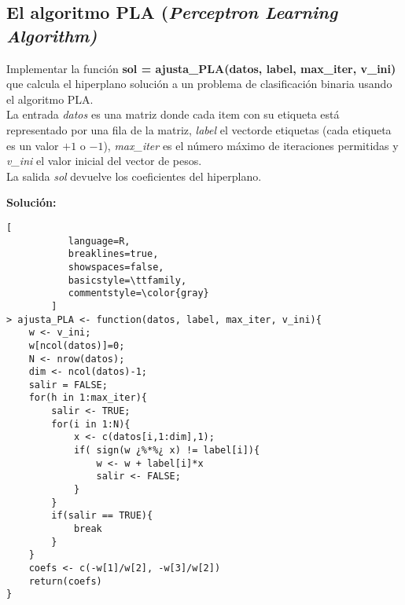 \documentclass[11pt,fleqn]{book} %
\begin{document}
\subsection{El algoritmo PLA (\textit{Perceptron Learning Algorithm)}}
\begin{exercise}
Implementar la función \textbf{sol = ajusta\_PLA(datos, label, max\_iter, v\_ini)} 
que calcula el hiperplano solución a un problema de clasificación binaria usando el algoritmo PLA.\\
La entrada \textit{datos} es una matriz donde cada item con su etiqueta está representado por una fila de la matriz, \textit{label} el vectorde etiquetas (cada etiqueta es un valor $+1$ o $-1$), \textit{max\_iter} es el número 
máximo de iteraciones permitidas y \textit{v\_ini} el valor inicial del vector de pesos. \\
La salida \textit{sol} devuelve los coeficientes del hiperplano.
\end{exercise}
\textbf{Solución:}
\lstset{escapeinside=¿}
\begin{lstlisting}[
           language=R,
           breaklines=true,
           showspaces=false,
           basicstyle=\ttfamily,
           commentstyle=\color{gray}
        ]
> ajusta_PLA <- function(datos, label, max_iter, v_ini){
    w <- v_ini;
    w[ncol(datos)]=0;
    N <- nrow(datos);
    dim <- ncol(datos)-1;
    salir = FALSE;
    for(h in 1:max_iter){
        salir <- TRUE;
        for(i in 1:N){
            x <- c(datos[i,1:dim],1);
            if( sign(w ¿%*%¿ x) != label[i]){
                w <- w + label[i]*x
                salir <- FALSE;
            }
        }
        if(salir == TRUE){
            break
        }
    }
    coefs <- c(-w[1]/w[2], -w[3]/w[2])
    return(coefs)
}
\end{lstlisting}
\end{document}
